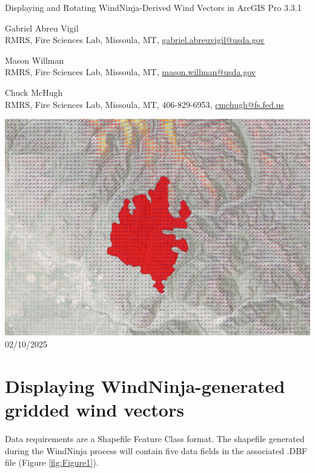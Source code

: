 \documentclass[12pt]{article}
\begin{document}
\begin{titlepage}
    \centering
    {\Huge
        Displaying and Rotating WindNinja-Derived Wind Vectors in ArcGIS Pro 3.3.1
    }
    \vfill
    {\Large
    Gabriel Abreu Vigil\\ RMRS, Fire Sciences Lab, Missoula, MT, \href{mailto:gabriel.abreuvigil@usda.gov}{gabriel.abreuvigil@usda.gov}

    Mason Willman\\ RMRS, Fire Sciences Lab, Missoula, MT, \href{mailto:mason.willman@usda.gov}{mason.willman@usda.gov}

    Chuck McHugh\\ RMRS, Fire Sciences Lab, Missoula, MT, 406-829-6953, \href{mailto:cmchugh@fs.fed.us}{cmchugh@fs.fed.us}
    }
    \vfill
    \includegraphics[scale=0.45]							{arc_00.png}
    \vfill
  	{\Large
	  02/10/2025 %
  	}
    \vfill
\end{titlepage}

\section*{Displaying WindNinja-generated gridded wind vectors}
Data requirements are a Shapefile Feature Class format. The shapefile generated during the WindNinja process will
contain five data fields in the associated .DBF file (Figure \ref{fig:Figure1}).
\end{document}
